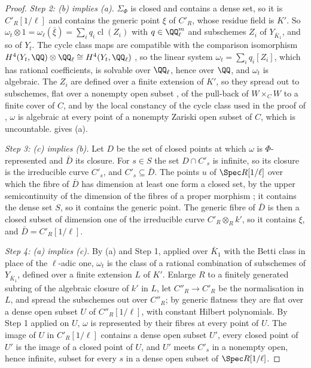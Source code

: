 \begin{proof}
\emph{Step 2: (b) implies (a).} $\Sigma_{\Phi}$ is closed and contains a dense
set, so it is $C'_{R}[1/\ell]$ and contains the generic point $\xi$ of
$C'_{R}$, whose residue field is $K'$. So $\omega_{t}\otimes1=
\omega_{\ell}(\bar\xi)=\sum_{i}q_{i}\operatorname{cl}(Z_{i})$ with
$q\in\QQ_{\ell}^{m}$ and subschemes $Z_{i}$ of $Y_{\bar{K}_{1}}$, and so of
$Y_{t}$. The cycle class maps are compatible with the comparison isomorphism
$H^{4}(Y_{t},\QQ)\otimes\QQ_{\ell}\cong H^{4}(Y_{t},\QQ_{\ell})$
\cite[Section~1 and Example~2.1(a)]{Del82}, so the linear system
$\omega_{t}=\sum_{i}q_{i}[Z_{i}]$, which has rational coefficients, is
solvable over $\QQ_{\ell}$, hence over $\QQ$, and $\omega_{t}$ is algebraic.
The $Z_{i}$ are defined over a finite extension of $K'$, so they spread out to
subschemes, flat over a nonempty open subset \cite[Tag~052A]{Stacks}, of the
pull-back of $W\times_{C}W$ to a finite cover of $C$, and by the local
constancy of the cycle class used in the proof of \cite[Theorem~16.4]{paperI},
$\omega$ is algebraic at every point of a nonempty Zariski open subset of $C$,
which is uncountable.  gives (a).

\emph{Step 3: (c) implies (b).} Let $D$ be the set of closed points at which
$\omega$ is $\Phi$-represented and $\bar{D}$ its closure. For $s\in S$ the set
$D\cap C'_{s}$ is infinite, so its closure is the irreducible curve $C'_{s}$,
and $C'_{s}\subseteq\bar{D}$. The points $u$ of $\Spec R[1/\ell]$ over which
the fibre of $\bar{D}$ has dimension at least one form a closed set, by the
upper semicontinuity of the dimension of the fibres of a proper morphism
\cite[Tag~0D4I]{Stacks}; it contains the dense set $S$, so it contains the
generic point. The generic fibre of $\bar{D}$ is then a closed subset of
dimension one of the irreducible curve $C'_{R}\otimes_{R}k'$, so it contains
$\xi$, and $\bar{D}=C'_{R}[1/\ell]$.

\emph{Step 4: (a) implies (c).} By (a) and Step 1, applied over $\bar{K}_{1}$
with the Betti class in place of the $\ell$-adic one, $\omega_{t}$ is the
class of a rational combination of subschemes of $Y_{\bar{K}_{1}}$, defined
over a finite extension $L$ of $K'$. Enlarge $R$ to a finitely generated
subring of the algebraic closure of $k'$ in $L$, let $C''_{R}\to C'_{R}$ be the
normalisation in $L$, and spread the subschemes out over $C''_{R}$; by generic
flatness \cite[Tag~052A]{Stacks} they are flat over a dense open subset $U$ of
$C''_{R}[1/\ell]$, with constant Hilbert polynomials. By Step 1 applied on $U$,
$\omega$ is represented by their fibres at every point of $U$. The image of $U$
in $C'_{R}[1/\ell]$ contains a dense open subset $U'$, every closed point of
$U'$ is the image of a closed point of $U$, and $U'$ meets $C'_{s}$ in a
nonempty open, hence infinite, subset for every $s$ in a dense open subset of
$\Spec R[1/\ell]$.


\end{proof}
